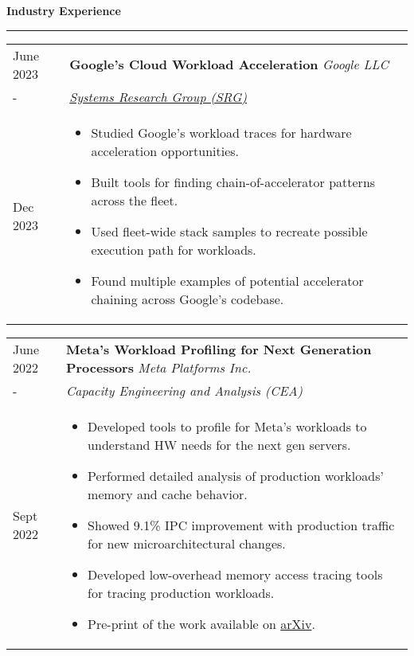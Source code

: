 \documentclass{article}
\newlength{\workexitemsep}
\newlength{\durlen}
\newlength{\deslen}
\newcommand{\sectiontitle}[1]{
  \textbf{\Large{\sffamily #1}}
  \begin{flushright}
      \vspace{-0.48cm} 
      \rule{0.975\textwidth}{1.1pt}
  \end{flushright}
  \vspace{-0.1cm} 
}
\begin{document}
\sectiontitle{Industry Experience}

\begin{tabular}{p{\durlen}p{\deslen}}
  \centering June 2023       & \textbf{Google's Cloud Workload Acceleration} \hfill \textit{Google LLC} \\
  \centering -               & \textit{\href{https://techsysinfra.google/research}{Systems Research Group (SRG)}}\\ 
  \centering Dec 2023        & \vspace{-0.6cm}\begin{itemize}[itemsep=\workexitemsep]
          \item Studied Google's workload traces for hardware acceleration opportunities.
          \item Built tools for finding chain-of-accelerator patterns across the fleet.
          \item Used fleet-wide stack samples to recreate possible execution path for workloads.
          \item Found multiple examples of potential accelerator chaining across Google's codebase.
  \end{itemize}
\end{tabular}

\begin{tabular}{p{\durlen} p{\deslen}}
  \centering June 2022       & \textbf{Meta's Workload Profiling for Next Generation Processors} \hfill \textit{Meta Platforms Inc.} \\
  \centering -               & \textit{Capacity Engineering and Analysis (CEA)} \\ 
  \centering Sept 2022       & \vspace{-0.6cm}\begin{itemize}[itemsep=\workexitemsep] 
          \item Developed tools to profile for Meta's workloads to understand HW needs for the next gen servers.
          \item Performed detailed analysis of production workloads' memory and cache behavior.
          \item Showed 9.1\% IPC improvement with production traffic for new microarchitectural changes.
          \item Developed low-overhead memory access tracing tools for tracing production workloads.
          \item Pre-print of the work available on \href{https://arxiv.org/pdf/2303.08396}{arXiv}.
  \end{itemize}
\end{tabular}
\end{document}
